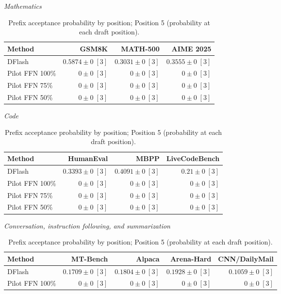 \documentclass[conference,onecolumn]{IEEEtran}
\begin{document}
\begin{table}[!htp]
\centering\small
\setlength{\tabcolsep}{3pt}
\caption{Prefix acceptance probability by position; Position 5 (probability at each draft position).}
\label{tab:appendix-metric-prefix-survival-5}
\textit{Mathematics}\par\smallskip
\begin{tabular}{@{}>{\raggedright\arraybackslash}p{3.7cm}rrr@{}}
\toprule
Method & GSM8K & MATH-500 & AIME 2025 \\
\midrule
DFlash & \(\mathbf{0.5874} \pm 0\;[3]\) & \(\mathbf{0.3031} \pm 0\;[3]\) & \(\mathbf{0.3555} \pm 0\;[3]\) \\
Pilot FFN 100\% & \(0 \pm 0\;[3]\) & \(0 \pm 0\;[3]\) & \(0 \pm 0\;[3]\) \\
Pilot FFN 75\% & \(0 \pm 0\;[3]\) & \(0 \pm 0\;[3]\) & \(0 \pm 0\;[3]\) \\
Pilot FFN 50\% & \(0 \pm 0\;[3]\) & \(0 \pm 0\;[3]\) & \(0 \pm 0\;[3]\) \\
\bottomrule
\end{tabular}\par\medskip
\textit{Code}\par\smallskip
\begin{tabular}{@{}>{\raggedright\arraybackslash}p{3.7cm}rrr@{}}
\toprule
Method & HumanEval & MBPP & LiveCodeBench \\
\midrule
DFlash & \(\mathbf{0.3393} \pm 0\;[3]\) & \(\mathbf{0.4091} \pm 0\;[3]\) & \(\mathbf{0.21} \pm 0\;[3]\) \\
Pilot FFN 100\% & \(0 \pm 0\;[3]\) & \(0 \pm 0\;[3]\) & \(0 \pm 0\;[3]\) \\
Pilot FFN 75\% & \(0 \pm 0\;[3]\) & \(0 \pm 0\;[3]\) & \(0 \pm 0\;[3]\) \\
Pilot FFN 50\% & \(0 \pm 0\;[3]\) & \(0 \pm 0\;[3]\) & \(0 \pm 0\;[3]\) \\
\bottomrule
\end{tabular}\par\medskip
\textit{Conversation, instruction following, and summarization}\par\smallskip
\begin{tabular}{@{}>{\raggedright\arraybackslash}p{3.7cm}rrrr@{}}
\toprule
Method & MT-Bench & Alpaca & Arena-Hard & CNN/DailyMail \\
\midrule
DFlash & \(\mathbf{0.1709} \pm 0\;[3]\) & \(\mathbf{0.1804} \pm 0\;[3]\) & \(\mathbf{0.1928} \pm 0\;[3]\) & \(\mathbf{0.1059} \pm 0\;[3]\) \\
Pilot FFN 100\% & \(0 \pm 0\;[3]\) & \(0 \pm 0\;[3]\) & \(0 \pm 0\;[3]\) & \(0 \pm 0\;[3]\) \\

\end{tabular}
\end{table}
\end{document}
